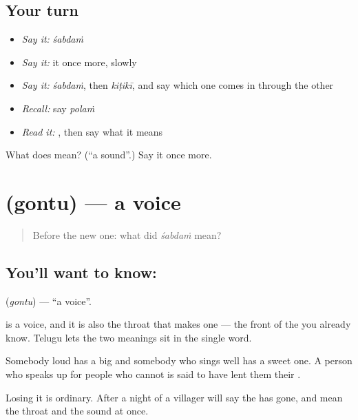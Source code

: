 \subsection*{Your turn}
\begin{itemize}
\raggedright
  \item \emph{Say it:} \emph{śabdaṁ}
  \item \emph{Say it:} it once more, slowly
  \item \emph{Say it:} \emph{śabdaṁ}, then \emph{kiṭikī}, and say which one comes in through the other
  \item \emph{Recall:} say \emph{polaṁ}
  \item \emph{Read it:} \textbf{}, then say what it means
\end{itemize}

\begin{tcolorbox}[breakable,colback=teal!4,colframe=teal!35!black,title={Before you move on}]
What does  mean? (\textquotedblleft{}a sound\textquotedblright{}.) Say it once more.
\end{tcolorbox}
\section[\texorpdfstring{\te{గొంతు} (gontu)}{గొంతు (gontu)}]{ (gontu) — a voice}

\label{lesson:TE-C68-voice}



\begin{quote}
Before the new one: what did \emph{śabdaṁ} mean?
\end{quote}

\subsection*{You'll want to know: }
\textbf{} (\emph{gontu}) — \textquotedblleft{}a voice\textquotedblright{}.

 is a voice, and it is also the throat that makes one — the front of the  you already know. Telugu lets the two meanings sit in the single word.

Somebody loud has a big  and somebody who sings well has a sweet one. A person who speaks up for people who cannot is said to have lent them their .

Losing it is ordinary. After a night of  a villager will say the  has gone, and mean the throat and the sound at once.

